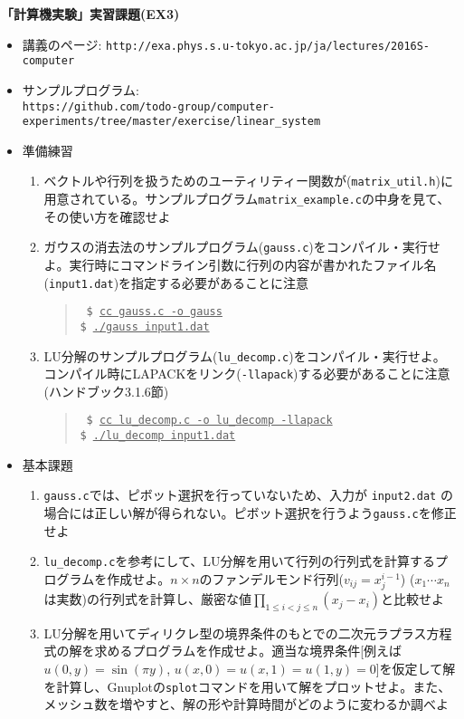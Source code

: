 \documentclass[11pt]{jarticle}
\begin{document}
\noindent
{\bf\large 「計算機実験」実習課題(EX3)}
\\[-0.5em]

\noindent
\begin{itemize}
\item 講義のページ: \verb+http://exa.phys.s.u-tokyo.ac.jp/ja/lectures/2016S-computer+

\item サンプルプログラム: \\ {\small \verb+https://github.com/todo-group/computer-experiments/tree/master/exercise/linear_system+}
  
\item 準備練習
  \begin{enumerate}
  \item ベクトルや行列を扱うためのユーティリティー関数が({\tt matrix\_util.h})に用意されている。サンプルプログラム{\tt matrix\_example.c}の中身を見て、その使い方を確認せよ
  \item ガウスの消去法のサンプルプログラム({\tt gauss.c})をコンパイル・実行せよ。実行時にコマンドライン引数に行列の内容が書かれたファイル名({\tt input1.dat})を指定する必要があることに注意
    \begin{quote} \tt
      \$ \underline{cc gauss.c -o gauss} \\
      \$ \underline{./gauss input1.dat}
    \end{quote}
  \item LU分解のサンプルプログラム({\tt lu\_decomp.c})をコンパイル・実行せよ。コンパイル時にLAPACKをリンク({\tt -llapack})する必要があることに注意(ハンドブック3.1.6節)
    \begin{quote} \tt
      \$ \underline{cc lu\_decomp.c -o lu\_decomp -llapack} \\
      \$ \underline{./lu\_decomp input1.dat}
    \end{quote}
  \end{enumerate}

\item 基本課題
  \begin{enumerate}
  \item {\tt gauss.c}では、ピボット選択を行っていないため、入力が {\tt input2.dat} の場合には正しい解が得られない。ピボット選択を行うよう{\tt gauss.c}を修正せよ
  \item {\tt lu\_decomp.c}を参考にして、LU分解を用いて行列の行列式を計算するプログラムを作成せよ。$n \times n$のファンデルモンド行列($v_{ij}=x_j^{i-1}$) ($x_1 \cdots x_n$は実数)の行列式を計算し、厳密な値$\displaystyle \prod_{1 \le i < j \le n} (x_j-x_i)$と比較せよ
  \item LU分解を用いてディリクレ型の境界条件のもとでの二次元ラプラス方程式の解を求めるプログラムを作成せよ。適当な境界条件[例えば$u(0,y) = \sin(\pi y)$, $u(x,0)=u(x,1)=u(1,y)=0$]を仮定して解を計算し、Gnuplotの{\tt splot}コマンドを用いて解をプロットせよ。また、メッシュ数を増やすと、解の形や計算時間がどのように変わるか調べよ
  \end{enumerate}
  

\end{itemize}
\end{document}
